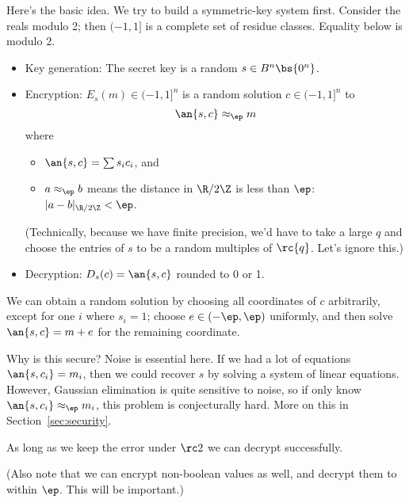 Here's the basic idea. We try to build a symmetric-key system first. Consider the reals modulo 2; then $(-1,1]$ is a complete set of residue classes. Equality below is modulo 2.
\begin{itemize}
\item
Key generation: The secret key is a random $s\in B^n\bs\{0^n\}$. 
\item
Encryption: $E_s(m)\in (-1,1]^n$ is a random solution $c\in (-1,1]^n$ to
\[
\an{s,c} \approx_{\ep} m
\]
where 
\begin{itemize}
\item
$\an{s,c}=\sum s_ic_i$, and
\item
$a\approx_{\ep}b$ means the distance in $\R/2\Z$ is less than $\ep$: $|a-b|_{\R/2\Z}< \ep$.
\end{itemize}
(Technically, because we have finite precision, we'd have to take a large $q$ and choose the entries of $s$ to be a random multiples of $\rc{q}$. Let's ignore this.)
\item
Decryption: $D_s(c)=\an{s,c}$ rounded to 0 or 1.
\end{itemize}
We can obtain a random solution by choosing all coordinates of $c$ arbitrarily, except for one $i$ where $s_i=1$; choose $e\in (-\ep,\ep)$ uniformly, and then solve $\an{s,c}=m+e$ for the remaining coordinate.

Why is this secure? Noise is essential here. If we had a lot of equations $\an{s,c_i}=m_i$, then we could recover $s$ by solving a system of linear equations. However, Gaussian elimination is quite sensitive to noise, so if only know $\an{s,c_i}\approx_{\ep}m_i$, this problem is conjecturally hard. More on this in Section~\ref{sec:security}.

As long as we keep the error under $\rc2$ we can decrypt successfully.

(Also note that we can encrypt non-boolean values as well, and decrypt them to within $\ep$. This will be important.)


